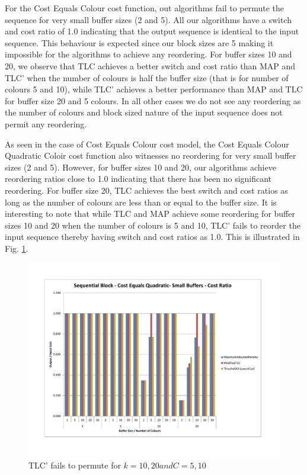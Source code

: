 For the Cost Equals Colour cost function, out algorithms fail to permute the sequence for very small buffer sizes (2 and 5). All our algorithms have a switch and cost ratio of 1.0 indicating that the output sequence is identical to the input sequence. This behaviour is expected since our block sizes are 5 making it impossible for the algorithms to achieve any reordering. For buffer sizes 10 and 20, we observe that TLC achieves a better switch and cost ratio than MAP and TLC' when the number of colours is half the buffer size (that is for number of colours 5 and 10), while TLC' achieves a better performance than MAP and TLC for buffer size 20 and 5 colours. In all other cases we do not see any reordering as the number of colours and block sized nature of the input sequence does not permit any reordering. 

As seen in the case of Cost Equals Colour cost model, the Cost Equals Colour Quadratic Coloir cost function also witnesses no reordering for very small buffer sizes (2 and 5). However, for buffer sizes 10 and 20, our algorithms achieve reordering ratios close to 1.0 indicating that there has been no significant reordering. For buffer size 20, TLC achieves the best switch and cost ratios as long as the number of colours are less than or equal to the buffer size. It is interesting to note that while TLC and MAP achieve some reordering for buffer sizes 10 and 20 when the number of colours is 5 and 10, TLC' fails to reorder the input sequence thereby having switch and cost ratios as 1.0. This is illustrated in Fig. \ref{sequentialBlockCQSmallCost}.

\begin{figure}[ht]
\centering 
\includegraphics[scale=0.60]{Sequential-Block-cq-small-cost.pdf}
\caption{TLC' fails to permute for $k = 10, 20 and C = 5, 10$}
\label{sequentialBlockCQSmallCost}
\end{figure}   

